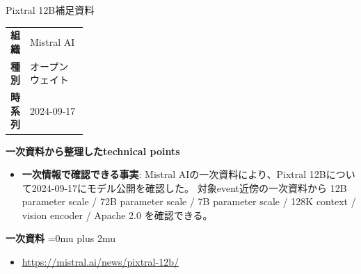 \begin{technicalnote}{Pixtral 12B}{補足資料}
\begingroup
\begin{tabularx}{\linewidth}{@{}>{\bfseries}p{0.22\linewidth}X@{}}
組織 & Mistral AI \\
種別 & オープンウェイト \\
時系列 & 2024-09-17 \\
\end{tabularx}
\smallskip
{\bfseries 一次資料から整理したtechnical points}
\begin{itemize}[leftmargin=1.5em,itemsep=0.35em]
\item \textbf{一次情報で確認できる事実}: Mistral AIの一次資料により、Pixtral 12Bについて2024-09-17にモデル公開を確認した。 対象event近傍の一次資料から 12B parameter scale / 72B parameter scale / 7B parameter scale / 128K context / vision encoder / Apache 2.0 を確認できる。
\end{itemize}
\begin{minipage}{\linewidth}
\begin{samepage}
{\bfseries 一次資料}
\begingroup\sloppy
\Urlmuskip=0mu plus 2mu\relax
\begin{itemize}[leftmargin=1.5em,itemsep=0.25em]
\item {\scriptsize\url{https://mistral.ai/news/pixtral-12b/}}
\end{itemize}
\endgroup
\end{samepage}
\end{minipage}
\endgroup
\end{technicalnote}
\medskip

